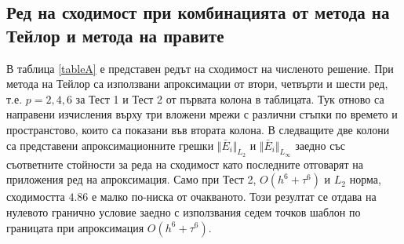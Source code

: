 \documentclass{article}
\begin{document}
\subsection{Ред на сходимост при комбинацията от метода на Тейлор и метода на правите}
В таблица \ref{tableA} е представен редът на сходимост на численото решение. При метода на Тейлор са използвани апроксимации от втори, четвърти и шести ред, т.е. $p=2,4,6$ за Тест 1 и Тест 2 от първата колона в таблицата. Тук отново са направени изчисления върху три вложени мрежи с различни стъпки по времето и пространстово, които са показани във втората колона. В следващите две колони са представени апроксимационните грешки $\Vert \bar E_i \Vert_{L_2} $ и $\Vert \bar E_i \Vert_{L_\infty}$ заедно със съответните стойности за реда на сходимост като последните отговарят на приложения ред на апроксимация. Само при Тест 2, $O(h^6 + \tau^6)$ и $L_2$ норма, сходимостта $4.86$ е малко по-ниска от очакваното. Този резултат се отдава на нулевото гранично условие заедно с използвания седем точков шаблон по границата при апроксимация $O(h^6 + \tau^6)$.
\end{document}

